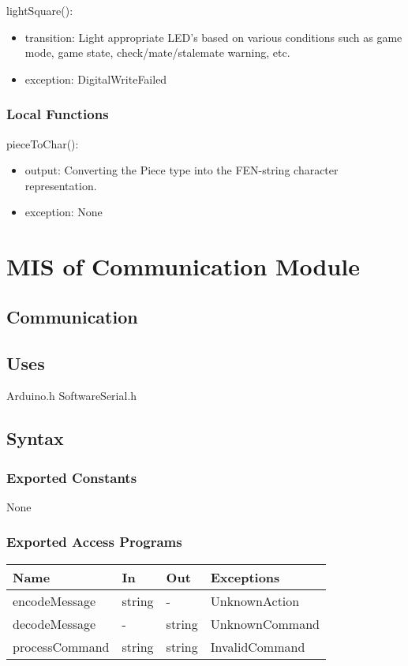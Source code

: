 \documentclass[12pt, titlepage]{article}
\begin{document}
\noindent lightSquare():
\begin{itemize}
\item transition: Light appropriate LED's based on various conditions such as game mode, game state, check/mate/stalemate warning, etc.
\item exception: DigitalWriteFailed
\end{itemize}

\subsubsection{Local Functions}{
  \noindent pieceToChar():
  \begin{itemize}
  \item output: Converting the Piece type into the FEN-string character representation.
  \item exception: None
  \end{itemize}
}

\newpage


\section{MIS of Communication Module} \label{CommunicationModule}

\subsection{Communication}

\subsection{Uses}
Arduino.h
SoftwareSerial.h

\subsection{Syntax}

\subsubsection{Exported Constants}{
  None
}

\subsubsection{Exported Access Programs}{
  \begin{center}
  \begin{tabular}{p{4cm} p{2cm} p{2cm} p{4cm}}
  \hline
  \textbf{Name} & \textbf{In} & \textbf{Out} & \textbf{Exceptions} \\
  \hline
  encodeMessage & string & - & UnknownAction \\
  \midrule
  decodeMessage & - & string & UnknownCommand \\
  \midrule
  processCommand & string & string & InvalidCommand \\
  \hline
  \end{tabular}
  \end{center}
}
\end{document}
